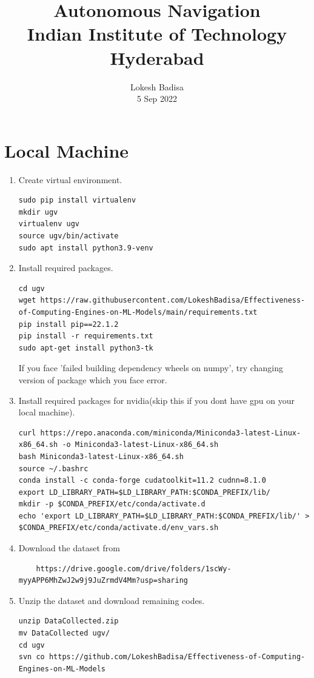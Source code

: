 \documentclass[journal,12pt,twocolumn]{IEEEtran}
\numberwithin{equation}{section}
\renewcommand\thesection{\arabic{section}}
\begin{document}
                             
\title{ Autonomous Navigation \\ \large Indian Institute of Technology Hyderabad}
\author{Lokesh Badisa \\ \vspace*{20pt} \normalsize 5 Sep 2022}   
 \maketitle 
 \tableofcontents
\section{Local Machine}
\begin{enumerate}[label=\thesection.\arabic*.,ref=\thesection.\theenumi]
\item Create virtual environment.
\begin{lstlisting}
sudo pip install virtualenv 
mkdir ugv
virtualenv ugv
source ugv/bin/activate
sudo apt install python3.9-venv
\end{lstlisting}
\item Install required packages.
\begin{lstlisting}
cd ugv
wget https://raw.githubusercontent.com/LokeshBadisa/Effectiveness-of-Computing-Engines-on-ML-Models/main/requirements.txt
pip install pip==22.1.2
pip install -r requirements.txt
sudo apt-get install python3-tk
\end{lstlisting}
If you face 'failed building dependency wheels on numpy', try changing version of package which you face error.
\item Install required packages for nvidia(skip this if you dont have gpu on your local machine).
\begin{lstlisting}
curl https://repo.anaconda.com/miniconda/Miniconda3-latest-Linux-x86_64.sh -o Miniconda3-latest-Linux-x86_64.sh
bash Miniconda3-latest-Linux-x86_64.sh
source ~/.bashrc
conda install -c conda-forge cudatoolkit=11.2 cudnn=8.1.0
export LD_LIBRARY_PATH=$LD_LIBRARY_PATH:$CONDA_PREFIX/lib/
mkdir -p $CONDA_PREFIX/etc/conda/activate.d
echo 'export LD_LIBRARY_PATH=$LD_LIBRARY_PATH:$CONDA_PREFIX/lib/' > $CONDA_PREFIX/etc/conda/activate.d/env_vars.sh
\end{lstlisting}
\item Download  the dataset from 
\begin{lstlisting}
	https://drive.google.com/drive/folders/1scWy-myyAPP6MhZwJ2w9j9JuZrmdV4Mm?usp=sharing
\end{lstlisting}
\item Unzip the dataset and download remaining codes.

\begin{lstlisting}
unzip DataCollected.zip
mv DataCollected ugv/
cd ugv
svn co https://github.com/LokeshBadisa/Effectiveness-of-Computing-Engines-on-ML-Models
\end{lstlisting}
\end{enumerate}
\end{document}

